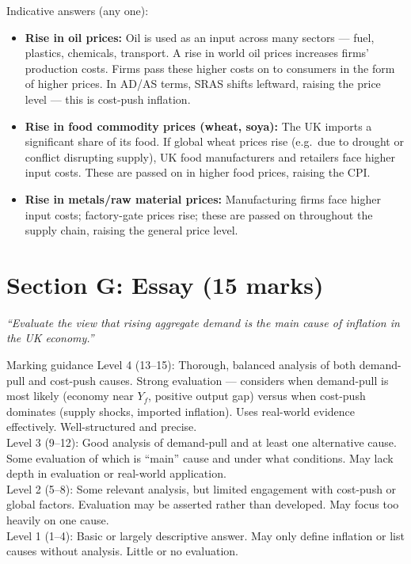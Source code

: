 \documentclass[12pt,a4paper]{article}
\begin{document}
\begin{enumerate}[leftmargin=*, label=\textbf{\arabic*.}]
    \vspace{0.3em}
    Indicative answers (any one):
    \begin{itemize}
        \item \textbf{Rise in oil prices:} Oil is used as an input across many sectors --- fuel, plastics, chemicals, transport. A rise in world oil prices increases firms' production costs. Firms pass these higher costs on to consumers in the form of higher prices. In AD/AS terms, SRAS shifts leftward, raising the price level --- this is cost-push inflation.
        \item \textbf{Rise in food commodity prices (wheat, soya):} The UK imports a significant share of its food. If global wheat prices rise (e.g.\ due to drought or conflict disrupting supply), UK food manufacturers and retailers face higher input costs. These are passed on in higher food prices, raising the CPI.
        \item \textbf{Rise in metals/raw material prices:} Manufacturing firms face higher input costs; factory-gate prices rise; these are passed on throughout the supply chain, raising the general price level.
    \end{itemize}

\end{enumerate}

\newpage

\section*{Section G: Essay (15 marks)}

\textit{``Evaluate the view that rising aggregate demand is the main cause of inflation in the UK economy.''}

\vspace{0.5em}

\begin{extract}{Marking guidance}
    Level 4 (13--15): Thorough, balanced analysis of both demand-pull and cost-push causes. Strong evaluation --- considers when demand-pull is most likely (economy near $Y_f$, positive output gap) versus when cost-push dominates (supply shocks, imported inflation). Uses real-world evidence effectively. Well-structured and precise.\\[0.4em]
    Level 3 (9--12): Good analysis of demand-pull and at least one alternative cause. Some evaluation of which is ``main'' cause and under what conditions. May lack depth in evaluation or real-world application.\\[0.4em]
    Level 2 (5--8): Some relevant analysis, but limited engagement with cost-push or global factors. Evaluation may be asserted rather than developed. May focus too heavily on one cause.\\[0.4em]
    Level 1 (1--4): Basic or largely descriptive answer. May only define inflation or list causes without analysis. Little or no evaluation.
\end{extract}
\end{document}
